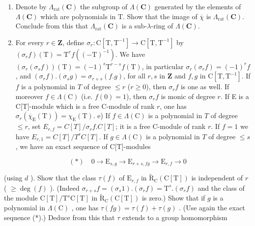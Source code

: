 \begin{enumerate}
\def\labelenumi{\alph{enumi})}
\setcounter{enumi}{2}
\item
  Denote by \(\Lambda_{\mathrm{rat}}(\mathbf{C})\) the subgroup of \(\Lambda(\mathbf{C})\) generated by the elements of \(\Lambda(\mathbf{C})\) which are polynomials in T. Show that the image of \(\overline{\chi}\) is \(\Lambda_{\mathrm{rat}}(\mathbf{C})\). Conclude from this that \(\Lambda_{\mathrm{rat}}(\mathbf{C})\) is a sub-\(\lambda\)-ring of \(\Lambda(\mathbf{C})\).
\item
  For every \(r \in \mathbf{Z}\), define \(\sigma_r: \mathrm{C}[\mathrm{T}, \mathrm{T}^{-1}] \to \mathrm{C}[\mathrm{T}, \mathrm{T}^{-1}]\) by \((\sigma_r f)(\mathrm{T}) = \mathrm{T}^{r} f((-\mathrm{T})^{-1})\). We have \((\sigma_r(\sigma_s f))(\mathrm{T}) = (-1)^s \mathrm{T}^{r-s} f(\mathrm{T})\), in particular \(\sigma_r(\sigma_r f) = (-1)^r f\), and \((\sigma_r f).(\sigma_s g) = \sigma_{r+s}(f.g)\), for all \(r, s\) in \(\mathbf{Z}\) and \(f, g\) in \(\mathrm{C}[\mathrm{T}, \mathrm{T}^{-1}]\). If \(f\) is a polynomial in \(T\) of degree \(\leqslant r\) (\(r \geqslant 0\)), then \(\sigma_r f\) is one as well. If moreover \(f \in \Lambda(\mathrm{C})\) (i.e. \(f(0) = 1\)), then \(\sigma_r f\) is monic of degree \(r\). If E is a C{[}T{]}-module which is a free C-module of rank \(r\), one has \(\sigma_r(\overline{\chi}_{\mathrm{E}}(\mathrm{T})) = \chi_{\mathrm{E}}(\mathrm{T})\). e) If \(f \in \Lambda(\mathrm{C})\) is a polynomial in \(T\) of degree \(\leqslant r\), set \(E_{r,f} = C[T]/\sigma_r f.C[T]\); it is a free C-module of rank \(r\). If \(f = 1\) we have \(E_{r,1} = C[T]/T^{r}C[T]\). If \(g \in \Lambda(\mathrm{C})\) is a polynomial in \(T\) of degree \(\leqslant s\), we have an exact sequence of C{[}T{]}-modules
\end{enumerate}

\[
(*) \quad 0 \rightarrow \mathrm{E} _ {s, g} \rightarrow \mathrm{E} _ {r + s, f g} \rightarrow \mathrm{E} _ {r, f} \rightarrow 0
\]

(using \(d\) ). Show that the class \(\tau(f)\) of \(\mathrm{E}_{r,f}\) in \(\tilde{\mathrm{R}}_{\mathrm{C}}(\mathrm{C}[\mathrm{T}])\) is independent of \(r\) ( \(\geqslant \deg(f)\) ). (Indeed \(\sigma_{r+s}f = (\sigma_s1).(\sigma_rf) = \mathrm{T}^s.(\sigma_rf)\) and the class of the module \(\mathrm{C}[\mathrm{T}] / \mathrm{T}^s\mathrm{C}[\mathrm{T}]\) in \(\tilde{\mathrm{R}}_{\mathrm{C}}(\mathrm{C}[\mathrm{T}])\) is zero.) Show that if \(g\) is a polynomial in \(\Lambda(\mathrm{C})\) , one has \(\tau(fg) = \tau(f) + \tau(g)\) . (Use again the exact sequence (*).) Deduce from this that \(\tau\) extends to a group homomorphism

